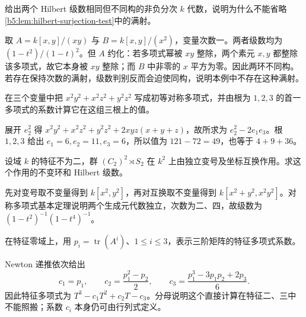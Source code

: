 \begin{optionalexercise}\label{b5:ex:22-equal-series-not-isomorphism}
	给出两个 Hilbert 级数相同但不同构的非负分次 \(k\) 代数，说明为什么不能省略\cref{b5:lem:hilbert-surjection-test}中的满射。
\end{optionalexercise}
\begin{solution}
	取 \(A=k[x,y]/(xy)\) 与 \(B=k[x,y]/(x^2)\)，变量次数一。两者级数均为 \((1-t^2)/(1-t)^2\)。但 \(A\) 约化：若多项式幂被 \(xy\) 整除，两个素元 \(x,y\) 都整除该多项式，故它本身被 \(xy\) 整除；而 \(B\) 中非零的 \(x\) 平方为零。因此两环不同构。若存在保持次数的满射，级数判别反而会迫使同构，说明本例中不存在这种满射。
\end{solution}

\begin{optionalexercise}\label{b5:ex:22-symmetric-reduction}
	在三个变量中把 \(x^2y^2+x^2z^2+y^2z^2\) 写成初等对称多项式，并由根为 \(1,2,3\) 的首一多项式的系数计算它在这组三根上的值。
\end{optionalexercise}
\begin{solution}
	展开 \(e_2^2\) 得 \(x^2y^2+x^2z^2+y^2z^2+2xyz(x+y+z)\)，故所求为 \(e_2^2-2e_1e_3\)。根 \(1,2,3\) 给出 \(e_1=6,e_2=11,e_3=6\)，所以值为 \(121-72=49\)，也等于 \(4+9+36\)。
\end{solution}

\begin{optionalexercise}\label{b5:ex:22-signed-permutation}
	设域 \(k\) 的特征不为二，群 \((C_2)^2\rtimes S_2\) 在 \(k^2\) 上由独立变号及坐标互换作用。求这个作用的不变环和 Hilbert 级数。
\end{optionalexercise}
\begin{solution}
	先对变号取不变量得到 \(k[x^2,y^2]\)，再对互换取不变量得到 \(k[x^2+y^2,x^2y^2]\)。对称多项式基本定理说明两个生成元代数独立，次数为二、四，故级数为 \((1-t^2)^{-1}(1-t^4)^{-1}\)。
\end{solution}

\begin{optionalexercise}\label{b5:ex:22-newton-three}
	在特征零域上，用 \(p_i=\operatorname{tr}(A^i)\)、\(1\le i\le3\)，表示三阶矩阵的特征多项式系数。
\end{optionalexercise}
\begin{solution}
	Newton 递推依次给出
	\[
		c_1=p_1,\qquad c_2=\frac{p_1^2-p_2}{2},\qquad c_3=\frac{p_1^3-3p_1p_2+2p_3}{6}.
	\]
	因此特征多项式为 \(T^3-c_1T^2+c_2T-c_3\)。分母说明这个直接计算在特征二、三中不能照搬；系数 \(c_i\) 本身仍可由行列式定义。
\end{solution}

